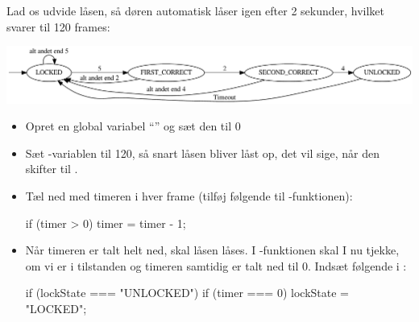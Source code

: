 \documentclass{ucph-handout}
\begin{document}
\begin{exercisebox}[adjusted title=Automatisk genlås efter 2 sekunder]
Lad os udvide låsen, så døren automatisk låser igen efter 2 sekunder,
hvilket svarer til 120 frames:

\noindent
\begin{center}
\includegraphics[width=1.0\textwidth]{../illustrations/graphviz/combinationLock_timeout}
\end{center}

\begin{itemize}
\item Opret en global variabel ``'' og sæt den til 0
\item Sæt -variablen til 120, så snart låsen bliver låst op, det vil
  sige, når den skifter  til .
\item Tæl ned med timeren i hver frame (tilføj følgende til -funktionen):

\begin{javascript}
if (timer > 0) {
    timer = timer - 1;
}
\end{javascript}

\item Når timeren er talt helt ned, skal låsen låses. I
  -funktionen skal I nu tjekke, om vi er i tilstanden
   og timeren samtidig er talt ned til 0. Indsæt
  følgende i :
  
\begin{javascript}
if (lockState === "UNLOCKED") {
    if (timer === 0) {
        lockState = "LOCKED";
    }
}
        
\end{javascript}
\end{itemize}
\end{exercisebox}
\end{document}
